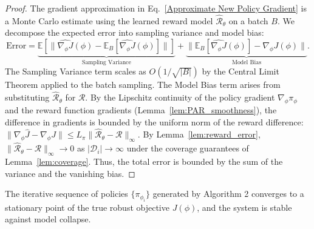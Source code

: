 \documentclass[./dissertation.tex]{subfiles}
\begin{document}
\begin{proof} 
The gradient approximation in Eq.~\ref{Approximate New Policy Gradient} is a Monte Carlo estimate using the learned reward model $\hat{\mathcal{R}}_\theta$ on a batch $B$. We decompose the expected error into sampling variance and model bias:
\begin{equation}
\text{Error} = \underbrace{\mathbb{E} \left[ \| \widehat{\nabla_{\phi} J}(\phi) - \mathbb{E}_{B} [ \widehat{\nabla_{\phi} J}(\phi) ] \| \right]}_{\text{Sampling Variance}} + \underbrace{\| \mathbb{E}_{B} [ \widehat{\nabla_{\phi} J}(\phi) ] - \nabla_{\phi} J(\phi) \|}_{\text{Model Bias}}.
\end{equation}
The Sampling Variance term scales as $O(1/\sqrt{|B|})$ by the Central Limit Theorem applied to the batch sampling.
The Model Bias term arises from substituting $\hat{\mathcal{R}}_\theta$ for $\mathcal{R}$. By the Lipschitz continuity of the policy gradient $\nabla_\phi \pi_\phi$ and the reward function gradients (Lemma~\ref{lem:PAR_smoothness}), the difference in gradients is bounded by the uniform norm of the reward difference: $\| \nabla_\phi \widehat{J} - \nabla_\phi J \| \leq L_{\pi} \| \hat{\mathcal{R}}_\theta - \mathcal{R} \|_{\infty}$. By Lemma~\ref{lem:reward_error}, $\| \hat{\mathcal{R}}_\theta - \mathcal{R} \|_{\infty} \to 0$ as $|\mathcal{D}_i| \to \infty$ under the coverage guarantees of Lemma~\ref{lem:coverage}.
Thus, the total error is bounded by the sum of the variance and the vanishing bias.
\end{proof}

\begin{theorem}
The iterative sequence of policies $\{ \pi_{\phi_i} \}$ generated by Algorithm 2 converges to a stationary point of the true robust objective $J(\phi)$, and the system is stable against model collapse.
\end{theorem}
\end{document}
